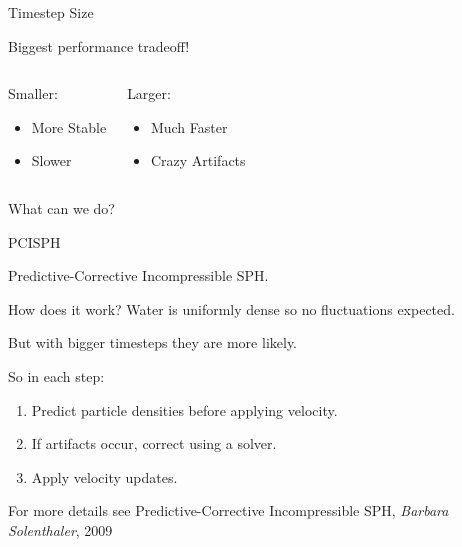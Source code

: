 \documentclass[12pt]{beamer}
\begin{document}
\begin{frame}[t]{Timestep Size}
\pause 

\color{white} Biggest performance tradeoff!

\begin{columns}[t]

\pause
{}

\begin{block}{Smaller:}

\begin{itemize}[<+->]
\item More Stable
\item \color{orange} Slower
\end{itemize}

\end{block}

\pause
{}

\begin{block}{Larger:}

\begin{itemize}[<+->]
\item \color{green} Much Faster
\item \color{red} Crazy Artifacts
\end{itemize}

\end{block}

\end{columns}

What can we do?

\end{frame}


\begin{frame}[t]{PCISPH}
\pause 

\color{white}
Predictive-Corrective \pause Incompressible \pause SPH.

\begin{block}{How does it work?}
Water is uniformly dense so no fluctuations expected. \pause

But with bigger timesteps they are more likely. \pause

So in each step:
\begin{enumerate}[<+->]
\item Predict particle densities before applying velocity.
\item If artifacts occur, correct using a solver.
\item Apply velocity updates.
\end{enumerate}

\end{block}

\tiny{For more details see Predictive-Corrective Incompressible SPH, \textit{Barbara Solenthaler}, 2009}

\end{frame}
\end{document}
